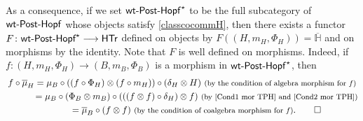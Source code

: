 \documentclass[10pt,a4paper]{amsart}
\numberwithin{equation}{section}
\begin{document}
As a consequence, if we set ${\sf wt}\textnormal{-}{\sf Post}\textnormal{-}{\sf Hopf}^{\star}$ to be the full subcategory of ${\sf wt}\textnormal{-}{\sf Post}\textnormal{-}{\sf Hopf}$ whose objects satisfy \eqref{classcocommH}, then there exists a functor $F\colon \textnormal{{\sf wt}-{\sf Post}-{\sf Hopf}}^{\star}\longrightarrow \sf{HTr}$ defined on objects by $F((H,m_{H},\Phi_{H}))=\overline{\mathbb{H}}$ and on morphisms by the identity. Note that $F$ is well defined on morphisms. Indeed, if $f\colon (H,m_{H},\Phi_{H})\rightarrow (B,m_{B},\Phi_{B})$ is a morphism in ${\sf wt}\textnormal{-}{\sf Post}\textnormal{-}{\sf Hopf}^{\star}$, then
\begin{gather*}
 f\circ\overline{\mu}_{H}= \mu_{B}\circ((f\circ\Phi_{H})\otimes(f\circ m_{H}))\circ(\delta_{H}\otimes H)\ \text{\footnotesize\textnormal{(by the condition of algebra morphism for $f$)}}\\
 \hphantom{f\circ\overline{\mu}_{H}}{}= \mu_{B}\circ(\Phi_{B}\otimes m_{B})\circ(((f\otimes f)\circ\delta_{H})\otimes f)\ \text{\footnotesize\textnormal{(by \eqref{Cond1 mor TPH} and \eqref{Cond2 mor TPH})}}\\
 \hphantom{f\circ\overline{\mu}_{H}}{}= \overline{\mu}_{B}\circ(f\otimes f)\ \text{\footnotesize\textnormal{(by the condition of coalgebra morphism for $f$)}}.\qedhere
\end{gather*}
\end{document}
